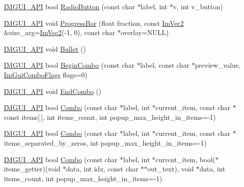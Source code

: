 \begin{DoxyCompactItemize}
\mbox{\hyperlink{imgui_8h_a43829975e84e45d1149597467a14bbf5}{I\+M\+G\+U\+I\+\_\+\+A\+PI}} bool \mbox{\hyperlink{namespace_im_gui_a018d2b61d2f00bb7a9dd2b1f933b93a5}{Radio\+Button}} (const char $\ast$label, int $\ast$v, int v\+\_\+button)
\item 
\mbox{\hyperlink{imgui_8h_a43829975e84e45d1149597467a14bbf5}{I\+M\+G\+U\+I\+\_\+\+A\+PI}} void \mbox{\hyperlink{namespace_im_gui_a83349d38c7c73f92ae977bc5b530a9e9}{Progress\+Bar}} (float fraction, const \mbox{\hyperlink{struct_im_vec2}{Im\+Vec2}} \&size\+\_\+arg=\mbox{\hyperlink{struct_im_vec2}{Im\+Vec2}}(-\/1, 0), const char $\ast$overlay=N\+U\+LL)
\item 
\mbox{\hyperlink{imgui_8h_a43829975e84e45d1149597467a14bbf5}{I\+M\+G\+U\+I\+\_\+\+A\+PI}} void \mbox{\hyperlink{namespace_im_gui_ae2d22212681556d2c2398dfd152f3121}{Bullet}} ()
\item 
\mbox{\hyperlink{imgui_8h_a43829975e84e45d1149597467a14bbf5}{I\+M\+G\+U\+I\+\_\+\+A\+PI}} bool \mbox{\hyperlink{namespace_im_gui_aa895095bdc7a2907375c555e245575ea}{Begin\+Combo}} (const char $\ast$label, const char $\ast$preview\+\_\+value, \mbox{\hyperlink{imgui_8h_aae31d1cfbcc55ae20b4122a7149d435e}{Im\+Gui\+Combo\+Flags}} flags=0)
\item 
\mbox{\hyperlink{imgui_8h_a43829975e84e45d1149597467a14bbf5}{I\+M\+G\+U\+I\+\_\+\+A\+PI}} void \mbox{\hyperlink{namespace_im_gui_a63434692d7de278875c7ea0143fbe6e4}{End\+Combo}} ()
\item 
\mbox{\hyperlink{imgui_8h_a43829975e84e45d1149597467a14bbf5}{I\+M\+G\+U\+I\+\_\+\+A\+PI}} bool \mbox{\hyperlink{namespace_im_gui_aa2979368da5b9e98d368449b36d166b2}{Combo}} (const char $\ast$label, int $\ast$current\+\_\+item, const char $\ast$const items\mbox{[}$\,$\mbox{]}, int items\+\_\+count, int popup\+\_\+max\+\_\+height\+\_\+in\+\_\+items=-\/1)
\item 
\mbox{\hyperlink{imgui_8h_a43829975e84e45d1149597467a14bbf5}{I\+M\+G\+U\+I\+\_\+\+A\+PI}} bool \mbox{\hyperlink{namespace_im_gui_ab982779804105fdc57355868ab531cad}{Combo}} (const char $\ast$label, int $\ast$current\+\_\+item, const char $\ast$items\+\_\+separated\+\_\+by\+\_\+zeros, int popup\+\_\+max\+\_\+height\+\_\+in\+\_\+items=-\/1)
\item 
\mbox{\hyperlink{imgui_8h_a43829975e84e45d1149597467a14bbf5}{I\+M\+G\+U\+I\+\_\+\+A\+PI}} bool \mbox{\hyperlink{namespace_im_gui_ae667a68f13233556aa1de9f672dd3f25}{Combo}} (const char $\ast$label, int $\ast$current\+\_\+item, bool($\ast$items\+\_\+getter)(void $\ast$data, int idx, const char $\ast$$\ast$out\+\_\+text), void $\ast$data, int items\+\_\+count, int popup\+\_\+max\+\_\+height\+\_\+in\+\_\+items=-\/1)
$$
\end{DoxyCompactItemize}

